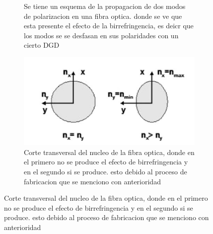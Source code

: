 \begin{enumerate}
\begin{figure}
\begin{subfigure}{0.4\textwidth}
		\caption{Se tiene un esquema de la propagacion de dos modos de polarizacion en una fibra optica. donde se ve que esta presente el efecto de la birrefringencia, es deicr que los modos se se desfasan en sus polaridades con un cierto DGD}
		\label{fig:second}
	\end{subfigure}
	\hfill
	\begin{subfigure}{0.4\textwidth}
		\includegraphics[width=\textwidth]{img/P5_3.png}
		\caption{Corte transversal del nucleo de la fibra optica, donde en el primero no se produce el efecto de birrefringencia y en el segundo si se produce. esto debido al proceso de fabricacion que se menciono con anterioridad}
		\label{fig:third}
	\end{subfigure}
			

\end{figure}
\end{enumerate}
